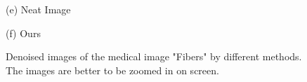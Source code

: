 \documentclass[runningheads]{llncs}
\begin{document}
\begin{figure}
{\begin{minipage}[t]{0.33\textwidth}
{\footnotesize (e) Neat Image}
\end{minipage}
\begin{minipage}[t]{0.33\textwidth}
\centering
{}
{\footnotesize (f) Ours }
\end{minipage}
}
\caption{Denoised images of the medical image "Fibers" by different methods. The images are better to be zoomed in on screen.}
\label{fig17}
\end{figure}
\end{document}
